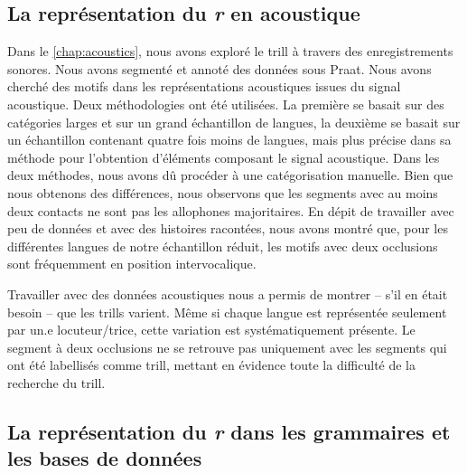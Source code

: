 \subsection*{La représentation du \textit{r} en acoustique}

Dans le \autoref{chap:acoustics}, nous avons exploré le trill à travers des enregistrements sonores. Nous avons segmenté et annoté des données sous Praat. Nous avons cherché des motifs dans les représentations acoustiques issues du signal acoustique. Deux méthodologies ont été utilisées. La première se basait sur des catégories larges et sur un grand échantillon de langues, la deuxième se basait sur un échantillon contenant quatre fois moins de langues, mais plus précise dans sa méthode pour l'obtention d'éléments composant le signal acoustique. Dans les deux méthodes, nous  avons dû procéder à une catégorisation manuelle. Bien que nous obtenons des différences, nous observons que les segments avec au moins deux contacts ne sont pas les allophones majoritaires. En dépit de travailler avec peu de données et avec des histoires racontées, nous avons montré que, pour les différentes langues de notre échantillon réduit, les motifs avec deux occlusions sont fréquemment en position intervocalique.

Travailler avec des données acoustiques nous a permis de montrer -- s'il en était besoin -- que les trills varient.
Même si chaque langue est représentée seulement par un.e locuteur/trice, cette variation est systématiquement présente.
Le segment à deux occlusions ne se retrouve pas uniquement avec les segments qui ont été labellisés comme trill, mettant en évidence toute la difficulté de la recherche du trill.

\subsection*{La représentation du \textit{r} dans les grammaires et les bases de données}

